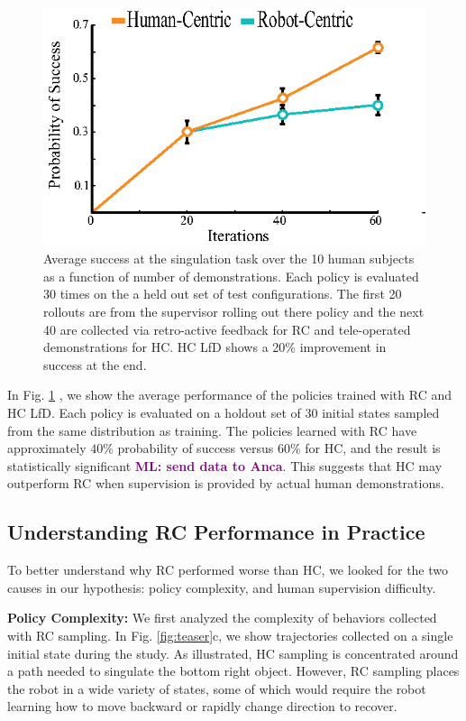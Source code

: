 \documentclass[10pt, conference]{ieeeconf}      %
\newcommand{\mlnote}[1]{\ifthenelse{ \boolean{include-notes}}%
 {\textcolor{purple}{\textbf{ML: #1}}}{}}
\begin{document}
\begin{figure}
\centering
\includegraphics{f_figs/izzy_reward.eps}
\caption{
    \footnotesize
Average success at the singulation task over the 10 human subjects as a function of number of demonstrations. Each policy is evaluated 30 times on the a held out set of test configurations. The first 20 rollouts are from the supervisor rolling out there policy and the next 40 are collected via retro-active feedback for RC and tele-operated demonstrations for HC. HC LfD shows a 20$\%$ improvement in success at the end. }

\label{fig:izzy_rw}
\end{figure}

In Fig. \ref{fig:izzy_rw} , we show the average performance of the policies trained with RC and HC LfD. Each policy is evaluated on a holdout set of 30 initial states sampled from the same distribution as training.
The policies learned with RC have approximately $40\%$ probability of success versus $60\%$ for HC, and the result is statistically significant\mlnote{send data to Anca}.
This suggests that HC may outperform RC when supervision is provided by actual human demonstrations.

\subsection{Understanding RC Performance in Practice}
To better understand why RC performed worse than HC, we looked for the two causes in our hypothesis: policy complexity, and human supervision difficulty.

\noindent\textbf{Policy Complexity: }We first analyzed the complexity of behaviors collected with RC sampling. In Fig. \ref{fig:teaser}c, we show trajectories collected on a single initial state during the study. As illustrated, HC sampling is concentrated around a path needed to singulate the bottom right object. However, RC sampling places the robot in a wide variety of states, some of which would require the robot learning how to move backward or rapidly change direction to recover. 
\end{document}
